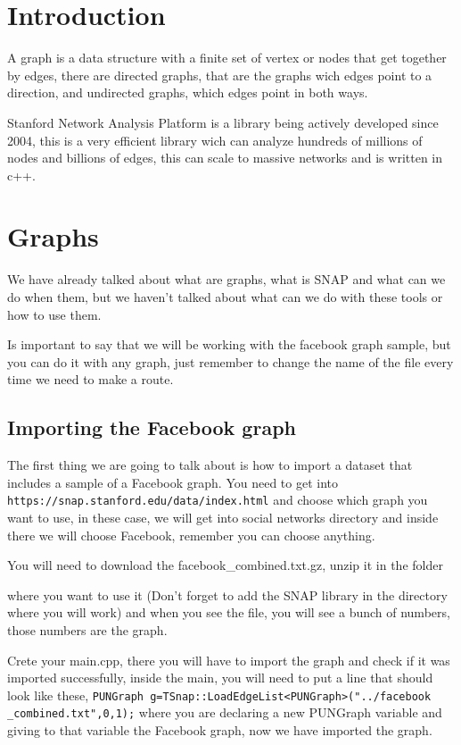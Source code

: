 \documentclass{sig-alternate-05-2015}
\begin{document}
\section{Introduction}
A graph is a data structure with a finite set of vertex or nodes
that get together by edges, there are directed graphs, that are
the graphs wich edges point to a direction, and undirected graphs,
which edges point in both ways.

Stanford Network Analysis Platform is a library being actively developed
since 2004, this is a very efficient library wich can analyze hundreds
of millions of nodes and billions of edges, this can scale to massive networks
and is written in c++.


\section{Graphs}
We have already talked about what are graphs, what is SNAP and what can
we do when them, but we haven't talked about what can we do with
these tools or how to use them.
  
Is important to say that we will be working with the facebook graph sample,
but you can do it with any graph, just remember to change the name of the
file every time we need to make a route.

\subsection{Importing the Facebook graph}
The first thing we are going to talk about is how to import a dataset that
includes a sample of a Facebook graph. You need to get into
\texttt{https://snap.stanford.edu/data/index.html} and choose which
graph you want to use, in these case, we will get into social networks directory
and inside there we will choose Facebook, remember you can choose anything.

You will need to download the facebook\_combined.txt.gz, unzip it in the folder

where you want to use it (Don't forget to add the SNAP library in the
directory where you will work) and when you see the file, you will see a
bunch of numbers, those numbers are the graph.

Crete your main.cpp, there you will have to import the graph and check if it was
imported successfully, inside the main, you will need to put a line that should
look like these,
\texttt{PUNGraph g=TSnap::LoadEdgeList<PUNGraph>("../facebook
\_combined.txt",0,1);}
where you are declaring a new PUNGraph variable
and giving to that variable the Facebook graph, now we have imported the graph.
\end{document}
